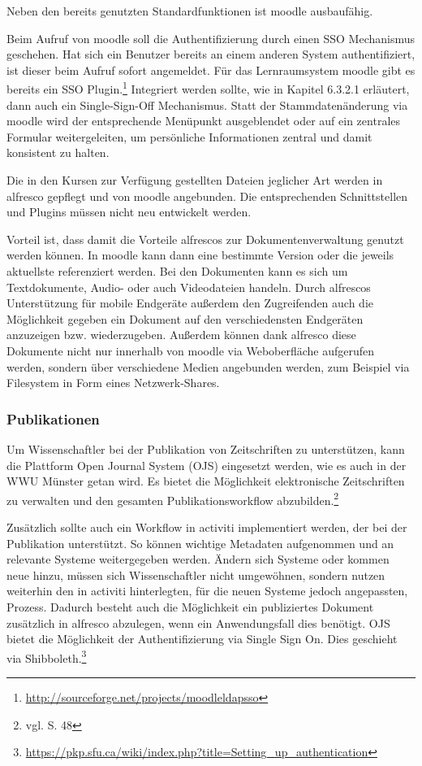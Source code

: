 Neben den bereits genutzten Standardfunktionen ist moodle ausbaufähig.

Beim Aufruf von moodle soll die Authentifizierung durch einen SSO Mechanismus geschehen. Hat sich ein Benutzer bereits an einem anderen System authentifiziert, ist dieser beim Aufruf sofort angemeldet. Für das Lernraumsystem moodle gibt es bereits ein SSO Plugin.\footnote{\url{http://sourceforge.net/projects/moodleldapsso}} Integriert werden sollte, wie in Kapitel 6.3.2.1 erläutert, dann auch ein Single-Sign-Off Mechanismus.
Statt der Stammdatenänderung via moodle wird der entsprechende Menüpunkt ausgeblendet oder auf ein zentrales Formular weitergeleiten, um persönliche Informationen zentral und damit konsistent zu halten.

Die in den Kursen zur Verfügung gestellten Dateien jeglicher Art werden in alfresco gepflegt und von moodle angebunden. Die entsprechenden Schnittstellen und Plugins müssen nicht neu entwickelt werden.

Vorteil ist, dass damit die Vorteile alfrescos zur Dokumentenverwaltung genutzt werden können. In moodle kann dann eine bestimmte Version oder die jeweils aktuellste referenziert werden. Bei den Dokumenten kann es sich um Textdokumente, Audio- oder auch Videodateien handeln. Durch alfrescos Unterstützung für mobile Endgeräte außerdem den Zugreifenden auch die Möglichkeit gegeben ein Dokument auf den verschiedensten Endgeräten anzuzeigen bzw. wiederzugeben. Außerdem können dank alfresco diese Dokumente nicht nur innerhalb von moodle via Weboberfläche aufgerufen werden, sondern über verschiedene Medien angebunden werden, zum Beispiel via Filesystem in Form eines Netzwerk-Shares.

\subsubsection{Publikationen}
Um Wissenschaftler bei der Publikation von Zeitschriften zu unterstützen, kann die Plattform Open Journal System (OJS) eingesetzt werden, wie es auch in der WWU Münster getan wird. Es bietet die Möglichkeit elektronische Zeitschriften zu verwalten und den gesamten Publikationsworkflow abzubilden.\footnote{vgl. \cite{vogl_fortschritte_2012} S. 48}

Zusätzlich sollte auch ein Workflow in activiti implementiert werden, der bei der Publikation unterstützt. So können wichtige Metadaten aufgenommen und an relevante Systeme weitergegeben werden. Ändern sich Systeme oder kommen neue hinzu, müssen sich Wissenschaftler nicht umgewöhnen, sondern nutzen weiterhin den in activiti hinterlegten, für die neuen Systeme jedoch angepassten, Prozess. Dadurch besteht auch die Möglichkeit ein publiziertes Dokument zusätzlich in alfresco abzulegen, wenn ein Anwendungsfall dies benötigt.
OJS bietet die Möglichkeit der Authentifizierung via Single Sign On. Dies geschieht via Shibboleth.\footnote{\url{https://pkp.sfu.ca/wiki/index.php?title=Setting_up_authentication}}

